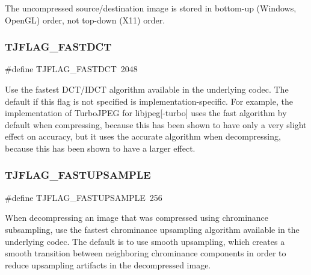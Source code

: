 The uncompressed source/destination image is stored in bottom-\/up (Windows, Open\+GL) order, not top-\/down (X11) order. \mbox{\label{group___turbo_j_p_e_g_gaabce235db80d3f698b27f36cbd453da2}} 
\subsubsection{\texorpdfstring{T\+J\+F\+L\+A\+G\+\_\+\+F\+A\+S\+T\+D\+CT}{TJFLAG\_FASTDCT}}
{\footnotesize\ttfamily \#define T\+J\+F\+L\+A\+G\+\_\+\+F\+A\+S\+T\+D\+CT~2048}

Use the fastest D\+C\+T/\+I\+D\+CT algorithm available in the underlying codec. The default if this flag is not specified is implementation-\/specific. For example, the implementation of Turbo\+J\+P\+EG for libjpeg\mbox{[}-\/turbo\mbox{]} uses the fast algorithm by default when compressing, because this has been shown to have only a very slight effect on accuracy, but it uses the accurate algorithm when decompressing, because this has been shown to have a larger effect. \mbox{\label{group___turbo_j_p_e_g_ga4ee4506c81177a06f77e2504a22efd2d}} 
\subsubsection{\texorpdfstring{T\+J\+F\+L\+A\+G\+\_\+\+F\+A\+S\+T\+U\+P\+S\+A\+M\+P\+LE}{TJFLAG\_FASTUPSAMPLE}}
{\footnotesize\ttfamily \#define T\+J\+F\+L\+A\+G\+\_\+\+F\+A\+S\+T\+U\+P\+S\+A\+M\+P\+LE~256}

When decompressing an image that was compressed using chrominance subsampling, use the fastest chrominance upsampling algorithm available in the underlying codec. The default is to use smooth upsampling, which creates a smooth transition between neighboring chrominance components in order to reduce upsampling artifacts in the decompressed image. \mbox{\label{group___turbo_j_p_e_g_ga4e872f11c82f241736fa8297920f24e5}} 

